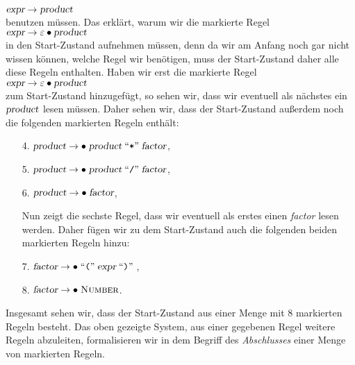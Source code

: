$\textsl{expr} \rightarrow \textsl{product}$
\\[0.2cm]
benutzen m\"ussen.  Das erkl\"art, warum wir die markierte Regel
\\[0.2cm]
\hspace*{1.3cm}
 $\textsl{expr} \rightarrow \varepsilon \bullet \textsl{product}$
\\[0.2cm]
in den Start-Zustand aufnehmen m\"ussen, denn 
da wir am Anfang noch gar nicht wissen k\"onnen, welche Regel wir ben\"otigen, muss
der Start-Zustand daher alle diese Regeln enthalten.  Haben wir erst die markierte Regel
\\[0.2cm]
\hspace*{1.3cm}
 $\textsl{expr} \rightarrow \varepsilon \bullet \textsl{product}$ 
\\[0.2cm]
zum Start-Zustand hinzugef\"ugt, so sehen wir, dass wir eventuell als n\"achstes ein $\textsl{product}$
lesen m\"ussen.  Daher sehen wir,  dass der Start-Zustand au{\ss}erdem noch die folgenden markierten
Regeln enth\"alt:  
\begin{enumerate}
\item[4.] $\textsl{product} \rightarrow \bullet\; \textsl{product} \;\mbox{``\texttt{*}''}\; \textsl{factor}$,
\item[5.] $\textsl{product} \rightarrow \bullet\; \textsl{product} \;\mbox{``\texttt{/}''}\; \textsl{factor}$,
\item[6.] $\textsl{product} \rightarrow \bullet\; \textsl{factor}$,

          Nun zeigt die sechste Regel, dass wir eventuell als erstes einen \textsl{factor}
          lesen werden.  Daher f\"ugen wir zu dem Start-Zustand auch die folgenden beiden markierten
          Regeln hinzu: 
\item[7.] $\textsl{factor} \rightarrow \bullet \;\mbox{``\texttt{(}''}\; \textsl{expr} \;\mbox{``\texttt{)}''}\;$,
\item[8.] $\textsl{factor} \rightarrow \bullet\; \textsc{Number}$.
\end{enumerate}
Insgesamt sehen wir, dass der Start-Zustand aus einer Menge mit 8 markierten Regeln besteht.
Das oben gezeigte System, aus einer gegebenen Regel weitere Regeln abzuleiten,
formalisieren wir in dem Begriff des \emph{Abschlusses} einer Menge von markierten
Regeln.

